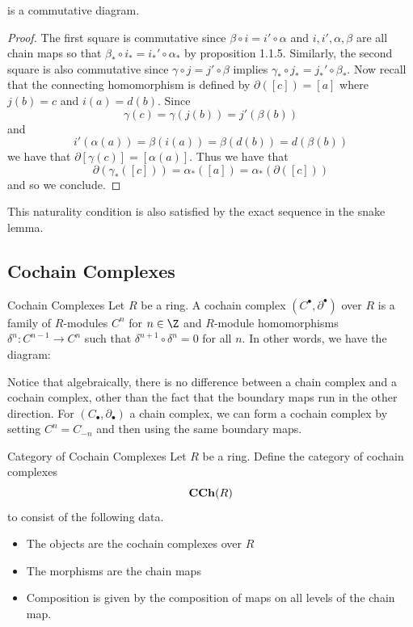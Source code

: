 \documentclass[a4paper]{article}
\begin{document}
\begin{thm}{}{}
is a commutative diagram. 
\begin{proof}
The first square is commutative since $\beta\circ i=i'\circ\alpha$ and $i,i',\alpha,\beta$ are all chain maps so that $\beta_\ast\circ i_\ast=i_\ast'\circ\alpha_\ast$ by proposition 1.1.5. Similarly, the second square is also commutative since $\gamma\circ j=j'\circ\beta$ implies $\gamma_\ast\circ j_\ast=j_\ast'\circ\beta_\ast$. Now recall that the connecting homomorphism is defined by $\partial([c])=[a]$ where $j(b)=c$ and $i(a)=d(b)$. Since $$\gamma(c)=\gamma(j(b))=j'(\beta(b))$$ and $$i'(\alpha(a))=\beta(i(a))=\beta(d(b))=d(\beta(b))$$ we have that $\partial[\gamma(c)]=[\alpha(a)]$. Thus we have that $$\partial(\gamma_\ast([c]))=\alpha_\ast([a])=\alpha_\ast(\partial([c]))$$ and so we conclude. 
\end{proof}
\end{thm}

This naturality condition is also satisfied by the exact sequence in the snake lemma. 

\subsection{Cochain Complexes}
\begin{defn}{Cochain Complexes}{} Let $R$ be a ring. A cochain complex $(C^\bullet,\partial^\bullet)$ over $R$ is a family of $R$-modules $C^n$ for $n\in\Z$ and $R$-module homomorphisms $\delta^n:C^{n-1}\to C^n$ such that $\delta^{n+1}\circ\delta^n=0$ for all $n$. In other words, we have the diagram: \\
\end{defn}

Notice that algebraically, there is no difference between a chain complex and a cochain complex, other than the fact that the boundary maps run in the other direction. For $(C_\bullet,\partial_\bullet)$ a chain complex, we can form a cochain complex by setting $C^n=C_{-n}$ and then using the same boundary maps. 

\begin{defn}{Category of Cochain Complexes}{} Let $R$ be a ring. Define the category of cochain complexes $$\bold{CCh}(R)$$ to consist of the following data. 
\begin{itemize}
\item The objects are the cochain complexes over $R$
\item The morphisms are the chain maps
\item Composition is given by the composition of maps on all levels of the chain map. 
\end{itemize}
\end{defn}
\end{document}
